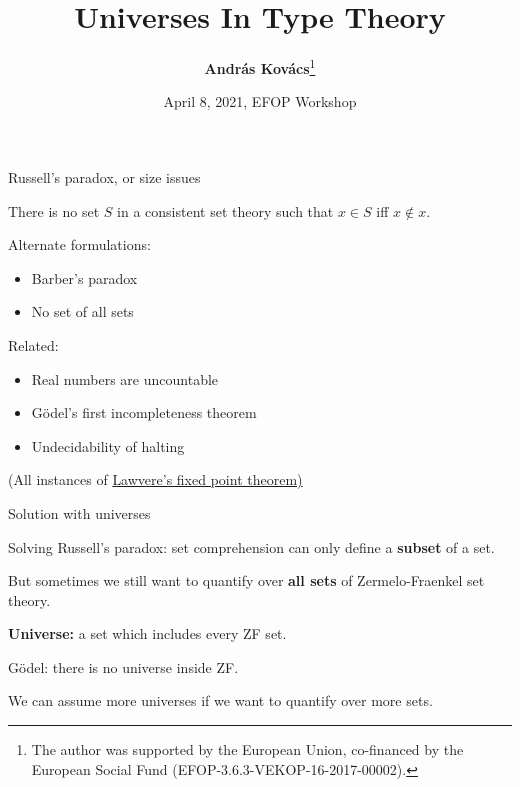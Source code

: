 \documentclass[dvipsnames,10pt,aspectratio=169]{beamer}
\title{Universes In Type Theory}
\date{April 8, 2021, EFOP Workshop}
\author{\normalsize{\vspace{-1em}\textbf{András Kovács}\footnote{The author was supported by the European Union, co-financed by the
European Social Fund (EFOP-3.6.3-VEKOP-16-2017-00002).\vspace{0.5em}}}}
\begin{document}
\maketitle


\begin{frame}{Russell's paradox, or size issues}

There is no set $S$ in a consistent set theory such that $x \in S$ iff $x \notin x$.
\vspace{1em}

Alternate formulations:
\begin{itemize}
  \item Barber's paradox
  \item No set of all sets
\end{itemize}
\vspace{1em}

Related:
\begin{itemize}
  \item Real numbers are uncountable
  \item Gödel's first incompleteness theorem
  \item Undecidability of halting
\end{itemize}
\vspace{1em}

{\footnotesize (All instances of \href{https://arxiv.org/pdf/math/0305282.pdf}{Lawvere's fixed point theorem)}}
\end{frame}


\begin{frame}{Solution with universes}

Solving Russell's paradox: set comprehension can only define a \textbf{subset} of a set.
\vspace{1em}

But sometimes we still want to quantify over \textbf{all sets} of
Zermelo-Fraenkel set theory.
\vspace{1em}

\textbf{Universe:} a set which includes every ZF set.
\vspace{1em}

Gödel: there is no universe inside ZF.
\vspace{1em}

We can assume more universes if we want to quantify over more sets.
\end{frame}
\end{document}
